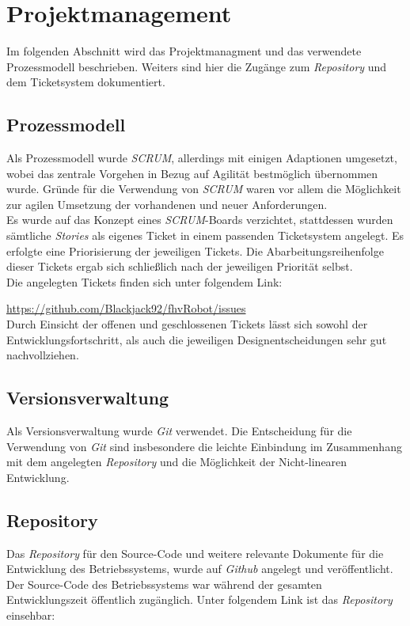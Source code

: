 \section{Projektmanagement}
Im folgenden Abschnitt wird das Projektmanagment und das verwendete Prozessmodell beschrieben. Weiters sind hier die Zugänge zum \textit{Repository} und dem Ticketsystem dokumentiert.

\subsection{Prozessmodell}
Als Prozessmodell wurde \textit{SCRUM}, allerdings mit einigen Adaptionen umgesetzt, wobei das zentrale Vorgehen in Bezug auf Agilität bestmöglich übernommen wurde. Gründe für die Verwendung von \textit{SCRUM} waren vor allem die Möglichkeit zur agilen Umsetzung der vorhandenen und neuer Anforderungen.\\
Es wurde auf das Konzept eines \textit{SCRUM}-Boards verzichtet, stattdessen wurden sämtliche \textit{Stories} als eigenes Ticket in einem passenden Ticketsystem angelegt. Es erfolgte eine Priorisierung der jeweiligen Tickets. Die Abarbeitungsreihenfolge dieser Tickets ergab sich schließlich nach der jeweiligen Priorität selbst.\\

Die angelegten Tickets finden sich unter folgendem Link:

\url{https://github.com/Blackjack92/fhvRobot/issues} \\

Durch Einsicht der offenen und geschlossenen Tickets lässt sich sowohl der Entwicklungsfortschritt, als auch die jeweiligen Designentscheidungen sehr gut nachvollziehen.

\subsection{Versionsverwaltung}
Als Versionsverwaltung wurde \textit{Git} verwendet. Die Entscheidung für die Verwendung von \textit{Git} sind insbesondere die leichte Einbindung im Zusammenhang mit dem angelegten \textit{Repository} und die Möglichkeit der Nicht-linearen Entwicklung.

\subsection{Repository}
\label{Repository}
Das \textit{Repository} für den Source-Code und weitere relevante Dokumente für die Entwicklung des Betriebssystems, wurde auf \textit{Github} angelegt und veröffentlicht. Der Source-Code des Betriebssystems war während der gesamten Entwicklungszeit öffentlich zugänglich. Unter folgendem Link ist das \textit{Repository} einsehbar:\\

